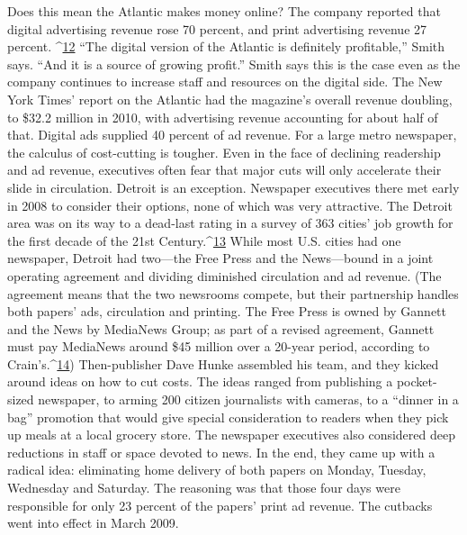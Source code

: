Does this mean the Atlantic makes money online? The company reported that
digital advertising revenue rose 70 percent, and print advertising revenue 27 percent.
^{\href{#endnotes-chapter-7}{12}} ``The digital version of the Atlantic is definitely profitable,'' Smith says.
``And it is a source of growing profit.'' Smith says this is the case even as the
company continues to increase staff and resources on the digital side. The New
York Times' report on the Atlantic had the magazine's overall revenue doubling,
to \$32.2 million in 2010, with advertising revenue accounting for about half of
that. Digital ads supplied 40 percent of ad revenue.
For a large metro newspaper, the calculus of cost-cutting is tougher. Even in
the face of declining readership and ad revenue, executives often fear that major
cuts will only accelerate their slide in circulation.
Detroit is an exception. Newspaper executives there met early in 2008 to
consider their options, none of which was very attractive. The Detroit area was
on its way to a dead-last rating in a survey of 363 cities' job growth for the first
decade of the 21st Century.^{\href{#endnotes-chapter-7}{13}} While most U.S. cities had one newspaper, Detroit
had two—the Free Press and the News—bound in a joint operating agreement
and dividing diminished circulation and ad revenue. (The agreement means that
the two newsrooms compete, but their partnership handles both papers' ads, circulation
and printing. The Free Press is owned by Gannett and the News by MediaNews
Group; as part of a revised agreement, Gannett must pay MediaNews
around \$45 million over a 20-year period, according to Crain's.^{\href{#endnotes-chapter-7}{14}})
Then-publisher Dave Hunke assembled his team, and they kicked around ideas
on how to cut costs. The ideas ranged from publishing a pocket-sized newspaper,
to arming 200 citizen journalists with cameras, to a ``dinner in a bag'' promotion
that would give special consideration to readers when they pick up meals at a
local grocery store. The newspaper executives also considered deep reductions in
staff or space devoted to news.
In the end, they came up with a radical idea: eliminating home delivery of
both papers on Monday, Tuesday, Wednesday and Saturday. The reasoning was
that those four days were responsible for only 23 percent of the papers' print ad
revenue. The cutbacks went into effect in March 2009.

